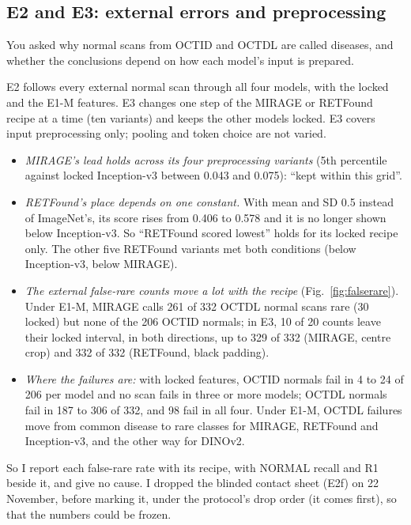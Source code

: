 \documentclass[10pt,a4paper]{article}
\newenvironment{parts}{\begin{description}[style=unboxed, leftmargin=0pt, itemsep=3pt, font=\normalfont\bfseries\itshape]}{\end{description}}
\newenvironment{topic}[2]{\subsection{#1}\label{#2}\begin{parts}}{\end{parts}}
\begin{document}
\begin{topic}{E2 and E3: external errors and preprocessing}{sec:e2e3}
\item[The problem.] You asked why normal scans from OCTID and OCTDL are called diseases, and whether the
conclusions depend on how each model's input is prepared.
\item[What I did.] E2 follows every external normal scan through all four models, with the locked and the E1-M
features. E3 changes one step of the MIRAGE or RETFound recipe at a time (ten variants) and keeps the other models
locked. E3 covers input preprocessing only; pooling and token choice are not varied.
\item[Result.] \mbox{}
\begin{itemize}
  \item \emph{MIRAGE's lead holds across its four preprocessing variants} (5th percentile against locked
        Inception-v3 between 0.043 and 0.075): ``kept within this grid''.
  \item \emph{RETFound's place depends on one constant.} With mean and SD 0.5 instead of ImageNet's, its score
        rises from 0.406 to 0.578 and it is no longer shown below Inception-v3. So ``RETFound scored lowest'' holds
        for its locked recipe only. The other five RETFound variants met both conditions (below Inception-v3,
        below MIRAGE).
  \item \emph{The external false-rare counts move a lot with the recipe} (Fig.~\ref{fig:falserare}). Under E1-M,
        MIRAGE calls 261 of 332 OCTDL normal scans rare (30 locked) but none of the 206 OCTID normals; in E3, 10 of
        20 counts leave their locked interval, in both directions, up to 329 of 332 (MIRAGE, centre crop) and 332
        of 332 (RETFound, black padding).
  \item \emph{Where the failures are:} with locked features, OCTID normals fail in 4 to 24 of 206 per model and no
        scan fails in three or more models; OCTDL normals fail in 187 to 306 of 332, and 98 fail in all four. Under
        E1-M, OCTDL failures move from common disease to rare classes for MIRAGE, RETFound and Inception-v3, and
        the other way for DINOv2.
\end{itemize}
So I report each false-rare rate with its recipe, with NORMAL recall and R1 beside it, and give no cause. I
dropped the blinded contact sheet (E2f) on 22 November, before marking it, under the protocol's drop order (it
comes first), so that the numbers could be frozen.
\end{topic}
\end{document}
